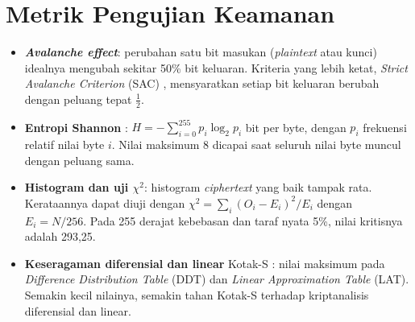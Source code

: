 \section{Metrik Pengujian Keamanan}
\begin{itemize}
    \item \textbf{\textit{Avalanche effect}}: perubahan satu bit masukan (\textit{plaintext} atau kunci) idealnya mengubah sekitar 50\% bit keluaran. Kriteria yang lebih ketat, \textit{Strict Avalanche Criterion} (SAC) \cite{webster1986}, mensyaratkan setiap bit keluaran berubah dengan peluang tepat $\frac12$.
    \item \textbf{Entropi Shannon} \cite{shannon1948}: $H = -\sum_{i=0}^{255} p_i \log_2 p_i$ bit per byte, dengan $p_i$ frekuensi relatif nilai byte $i$. Nilai maksimum 8 dicapai saat seluruh nilai byte muncul dengan peluang sama.
    \item \textbf{Histogram dan uji $\chi^2$}: histogram \textit{ciphertext} yang baik tampak rata. Kerataannya dapat diuji dengan $\chi^2 = \sum_i (O_i - E_i)^2 / E_i$ dengan $E_i = N/256$. Pada 255 derajat kebebasan dan taraf nyata 5\%, nilai kritisnya adalah 293,25.
    \item \textbf{Keseragaman diferensial dan linear} Kotak-S \cite{biham1991, matsui1994, heys2002}: nilai maksimum pada \textit{Difference Distribution Table} (DDT) dan \textit{Linear Approximation Table} (LAT). Semakin kecil nilainya, semakin tahan Kotak-S terhadap kriptanalisis diferensial dan linear.
\end{itemize}
